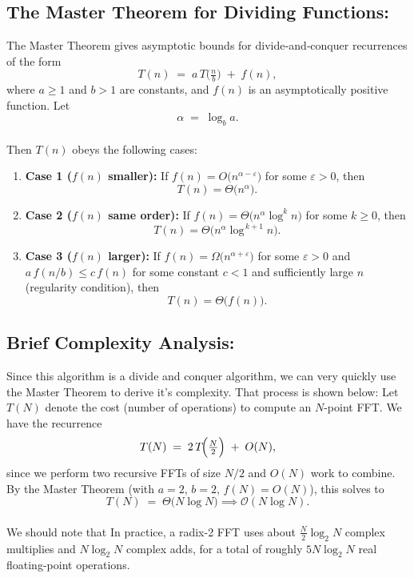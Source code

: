 \documentclass[12pt]{article}
\begin{document}
\subsection{The Master Theorem for Dividing Functions:}
The Master Theorem gives asymptotic bounds for divide‐and‐conquer recurrences of the form
\[
T(n) \;=\; a\,T\!\bigl(\tfrac{n}{b}\bigr) \;+\; f(n),
\]
\noindent where \(a \ge 1\) and \(b > 1\) are constants, and \(f(n)\) is an asymptotically positive function.  Let
\[
\alpha \;=\; \log_b a.
\]
\\
\noindent Then \(T(n)\) obeys the following cases:
\begin{enumerate}
  \item \textbf{Case 1 (\(f(n)\) smaller):}  
    If \(f(n) = O\bigl(n^{\alpha-\varepsilon}\bigr)\) for some \(\varepsilon>0\), then
    \[
      T(n) = \Theta\bigl(n^{\alpha}\bigr).
    \]
  \item \textbf{Case 2 (\(f(n)\) same order):}  
    If \(f(n) = \Theta\bigl(n^{\alpha}\log^k n\bigr)\) for some \(k\ge0\), then
    \[
      T(n) = \Theta\bigl(n^{\alpha}\log^{\,k+1}n\bigr).
    \]
  \item \textbf{Case 3 (\(f(n)\) larger):}  
    If \(f(n) = \Omega\bigl(n^{\alpha+\varepsilon}\bigr)\) for some \(\varepsilon>0\) and 
    \(a\,f(n/b)\le c\,f(n)\) for some constant \(c<1\) and sufficiently large \(n\) (regularity condition), then
    \[
      T(n) = \Theta\bigl(f(n)\bigr).
    \]
\end{enumerate}

\subsection{Brief Complexity Analysis:}
Since this algorithm is a divide and conquer algorithm, we can very quickly use the Master Theorem to derive it's complexity. That process is shown below:
Let \(T(N)\) denote the cost (number of operations) to compute an \(N\)-point FFT.  We have the recurrence
\[
T(N) \;=\; 2\,T\!\Bigl(\tfrac N2\Bigr)\;+\;O(N),
\]
\noindent since we perform two recursive FFTs of size \(N/2\) and \(O(N)\) work to combine.  By the Master Theorem (with \(a=2\), \(b=2\), \(f(N)=O(N)\)), this solves to
\[
T(N) \;=\; \Theta\bigl(N \log N\bigr) \implies \mathcal{O}(N \log N).
\]
\\
\noindent We should note that In practice, a radix-2 FFT uses about \(\tfrac N2\log_2 N\) complex multiplies and \(N\log_2 N\) complex adds, for a total of roughly \(5N\log_2 N\) real floating-point operations.
\end{document}

